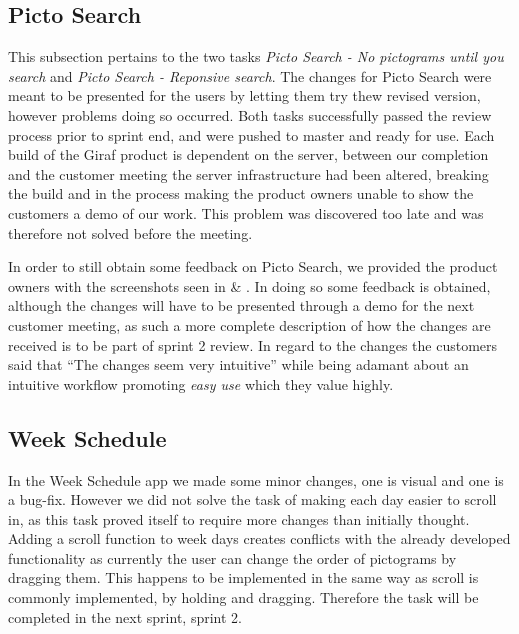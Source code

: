 \subsection{Picto Search}
This subsection pertains to the two tasks \textit{Picto Search - No pictograms until you search} and \textit{Picto Search - Reponsive search}.
The changes for Picto Search were meant to be presented for the users by letting them try thew revised version, however problems doing so occurred.
Both tasks successfully passed the review process prior to sprint end, and were pushed to master and ready for use.
Each build of the Giraf product is dependent on the server, between our completion and the customer meeting the server infrastructure had been altered, breaking the build and in the process making the product owners unable to show the customers a demo of our work.
This problem was discovered too late and was therefore not solved before the meeting.

In order to still obtain some feedback on Picto Search, we provided the product owners with the screenshots seen in  \& .
In doing so some feedback is obtained, although the changes will have to be presented through a demo for the next customer meeting, as such a more complete description of how the changes are received is to be part of sprint 2 review.   
In regard to the changes the customers said that \enquote{The changes seem very intuitive} while being adamant about an intuitive workflow promoting \textit{easy use} which they value highly.

\subsection{Week Schedule}
In the Week Schedule app we made some minor changes, one is visual and one is a bug-fix. 
However we did not solve the task of making each day easier to scroll in, as this task proved itself to require more changes than initially thought.
Adding a scroll function to week days creates conflicts with the already developed functionality as currently the user can change the order of pictograms by dragging them.
This happens to be implemented in the same way as scroll is commonly implemented, by holding and dragging.
Therefore the task will be completed in the next sprint, sprint 2.